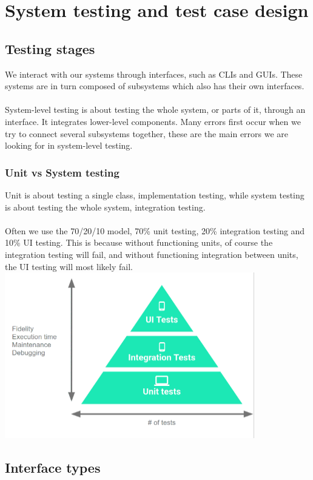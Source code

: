 \chapter{System testing and test case design}
\section{Testing stages}
We interact with our systems through interfaces, such as CLIs and GUIs. These systems are in turn composed of subsystems which also has their own interfaces.\\
\\
System-level testing is about testing the whole system, or parts of it, through an interface. It integrates lower-level components. Many errors first occur when we try to connect several subsystems together, these are the main errors we are looking for in system-level testing.
\subsection{Unit vs System testing}
Unit is about testing a single class, implementation testing, while system testing is about testing the whole system, integration testing.\\
\\
Often we use the 70/20/10 model, 70\% unit testing, 20\% integration testing and 10\% UI testing. This is because without functioning units, of course the integration testing will fail, and without functioning integration between units, the UI testing will most likely fail.\\
\includegraphics[width=0.5\pdfpagewidth]{lessons/images/70-20-10.png}\\

\section{Interface types}
